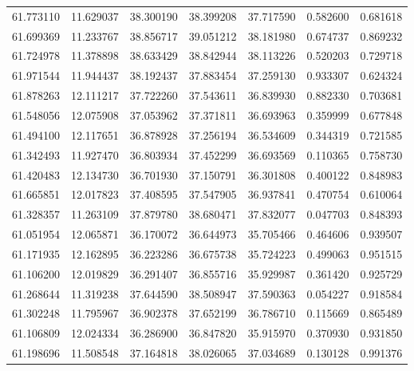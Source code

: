 \begin{tabular}{rrrrrrr}
 61.773110 &  11.629037 &         38.300190 &         38.399208 &         37.717590 &  0.582600 &  0.681618 \\
 61.699369 &  11.233767 &         38.856717 &         39.051212 &         38.181980 &  0.674737 &  0.869232 \\
 61.724978 &  11.378898 &         38.633429 &         38.842944 &         38.113226 &  0.520203 &  0.729718 \\
 61.971544 &  11.944437 &         38.192437 &         37.883454 &         37.259130 &  0.933307 &  0.624324 \\
 61.878263 &  12.111217 &         37.722260 &         37.543611 &         36.839930 &  0.882330 &  0.703681 \\
 61.548056 &  12.075908 &         37.053962 &         37.371811 &         36.693963 &  0.359999 &  0.677848 \\
 61.494100 &  12.117651 &         36.878928 &         37.256194 &         36.534609 &  0.344319 &  0.721585 \\
 61.342493 &  11.927470 &         36.803934 &         37.452299 &         36.693569 &  0.110365 &  0.758730 \\
 61.420483 &  12.134730 &         36.701930 &         37.150791 &         36.301808 &  0.400122 &  0.848983 \\
 61.665851 &  12.017823 &         37.408595 &         37.547905 &         36.937841 &  0.470754 &  0.610064 \\
 61.328357 &  11.263109 &         37.879780 &         38.680471 &         37.832077 &  0.047703 &  0.848393 \\
 61.051954 &  12.065871 &         36.170072 &         36.644973 &         35.705466 &  0.464606 &  0.939507 \\
 61.171935 &  12.162895 &         36.223286 &         36.675738 &         35.724223 &  0.499063 &  0.951515 \\
 61.106200 &  12.019829 &         36.291407 &         36.855716 &         35.929987 &  0.361420 &  0.925729 \\
 61.268644 &  11.319238 &         37.644590 &         38.508947 &         37.590363 &  0.054227 &  0.918584 \\
 61.302248 &  11.795967 &         36.902378 &         37.652199 &         36.786710 &  0.115669 &  0.865489 \\
 61.106809 &  12.024334 &         36.286900 &         36.847820 &         35.915970 &  0.370930 &  0.931850 \\
 61.198696 &  11.508548 &         37.164818 &         38.026065 &         37.034689 &  0.130128 &  0.991376 \\

\end{tabular}
